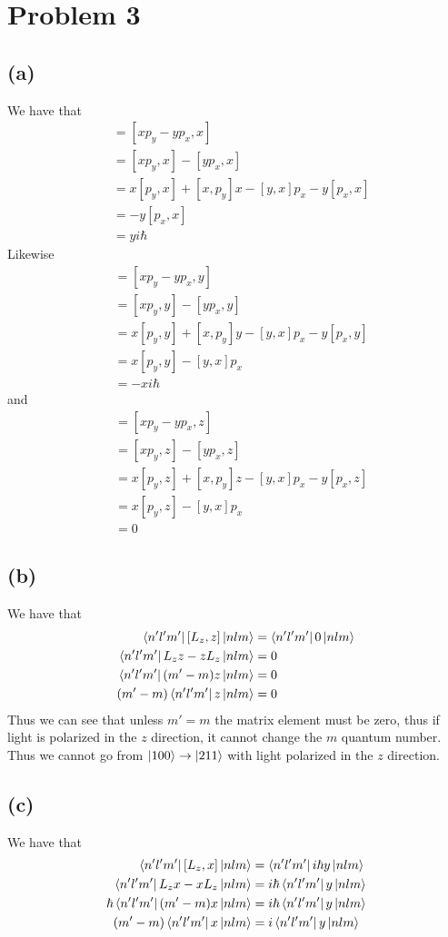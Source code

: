 \documentclass[11pt]{article}
\begin{document}
\section*{Problem 3}
\subsection*{(a)}
We have that 
\begin{align*}
    [L_z,x] &= [xp_y-yp_x,x]\\
    &= [xp_y,x]-[yp_x,x]\\
    &= x[p_y,x]+[x,p_y]x-[y,x]p_x-y[p_x,x]\\
    &= -y[p_x,x]\\
    &= yi\hbar
\end{align*}
Likewise 
\begin{align*}
    [L_z,y] &= [xp_y-yp_x,y]\\
    &= [xp_y,y]-[yp_x,y]\\
    &= x[p_y,y]+[x,p_y]y-[y,x]p_x-y[p_x,y]\\
    &= x[p_y,y]-[y,x]p_x\\
    &= -xi\hbar
\end{align*}
and 
\begin{align*}
    [L_z,z] &= [xp_y-yp_x,z]\\
    &= [xp_y,z]-[yp_x,z]\\
    &= x[p_y,z]+[x,p_y]z-[y,x]p_x-y[p_x,z]\\
    &= x[p_y,z]-[y,x]p_x\\
    &= 0
\end{align*}
\subsection*{(b)}
We have that 
\begin{align*}
    \bra{n'l'm'}[L_z,z]\ket{nlm} &= \bra{n'l'm'}0\ket{nlm}\\
    \bra{n'l'm'}L_zz-zL_z\ket{nlm} &= 0\\
    \bra{n'l'm'}(m'-m)z\ket{nlm} &= 0\\
    (m'-m)\bra{n'l'm'}z\ket{nlm} &= 0
\end{align*}
Thus we can see that unless $m'=m$ the matrix element must be zero, thus if 
light is polarized in the $z$ direction, it cannot change the $m$ quantum number.
Thus we cannot go from $\ket{100}\to\ket{211}$ with light polarized in the $z$ direction.
\subsection*{(c)}
We have that
\begin{align*}
    \bra{n'l'm'}[L_z,x]\ket{nlm} &= \bra{n'l'm'}i\hbar y\ket{nlm}\\
    \bra{n'l'm'}L_zx-xL_z\ket{nlm} &= i\hbar\bra{n'l'm'}y\ket{nlm}\\
    \hbar \bra{n'l'm'}(m'-m)x\ket{nlm} &= i\hbar\bra{n'l'm'}y\ket{nlm}\\
    (m'-m)\bra{n'l'm'}x\ket{nlm} &= i\bra{n'l'm'}y\ket{nlm}
\end{align*}
\end{document}
